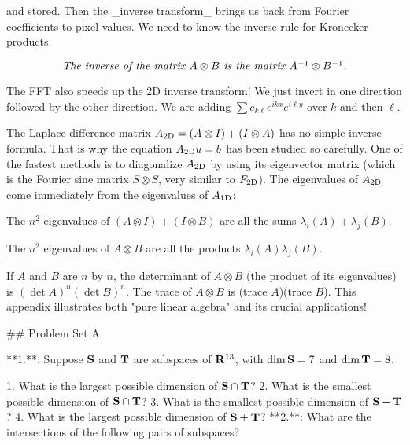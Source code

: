 and stored. Then the _inverse transform_ brings us back from Fourier coefficients to pixel values. We need to know the inverse rule for Kronecker products:

\[\mbox{\it The inverse of the matrix $A\otimes B$ is the matrix $A^{-1}\otimes B^{-1}$.}\]

The FFT also speeds up the 2D inverse transform! We just invert in one direction followed by the other direction. We are adding \(\sum c_{k\ell}e^{ikx}e^{i\ell y}\) over \(k\) and then \(\ell\).

The Laplace difference matrix \(A_{\rm 2D}=(A\otimes I)+(I\otimes A)\) has no simple inverse formula. That is why the equation \(A_{\rm 2D}u=b\) has been studied so carefully. One of the fastest methods is to diagonalize \(A_{\rm 2D}\) by using its eigenvector matrix (which is the Fourier sine matrix \(S\otimes S\), very similar to \(F_{\rm 2D}\)). The eigenvalues of \(A_{\rm 2D}\) come immediately from the eigenvalues of \(A_{\rm 1D}\):

The \(n^{2}\) eigenvalues of \((A\otimes I)+(I\otimes B)\) are all the sums \(\lambda_{i}(A)+\lambda_{j}(B)\).

The \(n^{2}\) eigenvalues of \(A\otimes B\) are all the products \(\lambda_{i}(A)\lambda_{j}(B)\).

If \(A\) and \(B\) are \(n\) by \(n\), the determinant of \(A\otimes B\) (the product of its eigenvalues) is \((\det A)^{n}(\det B)^{n}\). The trace of \(A\otimes B\) is (trace \(A\))(trace \(B\)). This appendix illustrates both "pure linear algebra" and its crucial applications!

## Problem Set A

**1.**: Suppose \({\bf S}\) and \({\bf T}\) are subspaces of \({\bf R}^{13}\), with \(\dim{\bf S}=7\) and \(\dim{\bf T}=8\).

1. What is the largest possible dimension of \({\bf S}\cap{\bf T}\)?
2. What is the smallest possible dimension of \({\bf S}\cap{\bf T}\)?
3. What is the smallest possible dimension of \({\bf S}+{\bf T}\)?
4. What is the largest possible dimension of \({\bf S}+{\bf T}\)?
**2.**: What are the intersections of the following pairs of subspaces? 